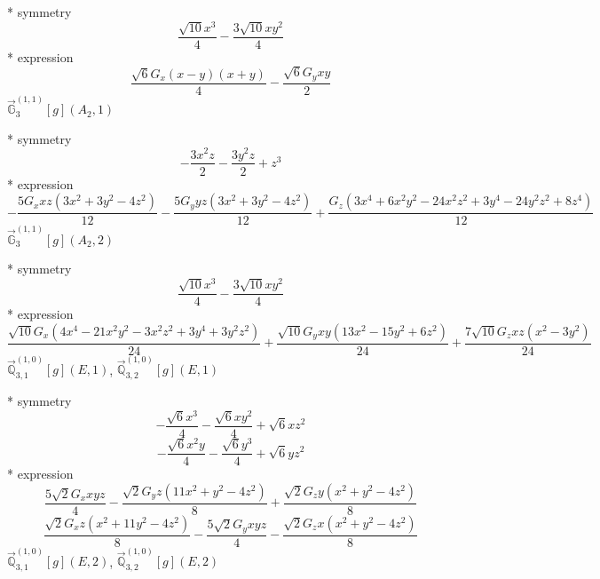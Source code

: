 \documentclass[fleqn,8pt]{jsarticle}
\begin{document}
\noindent\quad ** symmetry
\begin{dmath*}
\frac{\sqrt{10} x^{3}}{4} - \frac{3 \sqrt{10} x y^{2}}{4}
\end{dmath*}
\noindent\quad ** expression
\begin{dmath*}
\frac{\sqrt{6} G_{x} \left(x - y\right) \left(x + y\right)}{4} - \frac{\sqrt{6} G_{y} x y}{2}
\end{dmath*}
\noindent\quad $\vec{\mathbb{G}}_{3}^{(1,1)}[g](A_{2},1)$

\noindent\quad ** symmetry
\begin{dmath*}
- \frac{3 x^{2} z}{2} - \frac{3 y^{2} z}{2} + z^{3}
\end{dmath*}
\noindent\quad ** expression
\begin{dmath*}
- \frac{5 G_{x} x z \left(3 x^{2} + 3 y^{2} - 4 z^{2}\right)}{12} - \frac{5 G_{y} y z \left(3 x^{2} + 3 y^{2} - 4 z^{2}\right)}{12} + \frac{G_{z} \left(3 x^{4} + 6 x^{2} y^{2} - 24 x^{2} z^{2} + 3 y^{4} - 24 y^{2} z^{2} + 8 z^{4}\right)}{12}
\end{dmath*}
\noindent\quad $\vec{\mathbb{G}}_{3}^{(1,1)}[g](A_{2},2)$

\noindent\quad ** symmetry
\begin{dmath*}
\frac{\sqrt{10} x^{3}}{4} - \frac{3 \sqrt{10} x y^{2}}{4}
\end{dmath*}
\noindent\quad ** expression
\begin{dmath*}
\frac{\sqrt{10} G_{x} \left(4 x^{4} - 21 x^{2} y^{2} - 3 x^{2} z^{2} + 3 y^{4} + 3 y^{2} z^{2}\right)}{24} + \frac{\sqrt{10} G_{y} x y \left(13 x^{2} - 15 y^{2} + 6 z^{2}\right)}{24} + \frac{7 \sqrt{10} G_{z} x z \left(x^{2} - 3 y^{2}\right)}{24}
\end{dmath*}
\noindent\quad $\vec{\mathbb{Q}}_{3,1}^{(1,0)}[g](E,1)$, $\vec{\mathbb{Q}}_{3,2}^{(1,0)}[g](E,1)$

\noindent\quad ** symmetry
\begin{dmath*}
- \frac{\sqrt{6} x^{3}}{4} - \frac{\sqrt{6} x y^{2}}{4} + \sqrt{6} x z^{2}
\end{dmath*}
\begin{dmath*}
- \frac{\sqrt{6} x^{2} y}{4} - \frac{\sqrt{6} y^{3}}{4} + \sqrt{6} y z^{2}
\end{dmath*}
\noindent\quad ** expression
\begin{dmath*}
\frac{5 \sqrt{2} G_{x} x y z}{4} - \frac{\sqrt{2} G_{y} z \left(11 x^{2} + y^{2} - 4 z^{2}\right)}{8} + \frac{\sqrt{2} G_{z} y \left(x^{2} + y^{2} - 4 z^{2}\right)}{8}
\end{dmath*}
\begin{dmath*}
\frac{\sqrt{2} G_{x} z \left(x^{2} + 11 y^{2} - 4 z^{2}\right)}{8} - \frac{5 \sqrt{2} G_{y} x y z}{4} - \frac{\sqrt{2} G_{z} x \left(x^{2} + y^{2} - 4 z^{2}\right)}{8}
\end{dmath*}
\noindent\quad $\vec{\mathbb{Q}}_{3,1}^{(1,0)}[g](E,2)$, $\vec{\mathbb{Q}}_{3,2}^{(1,0)}[g](E,2)$
\end{document}
